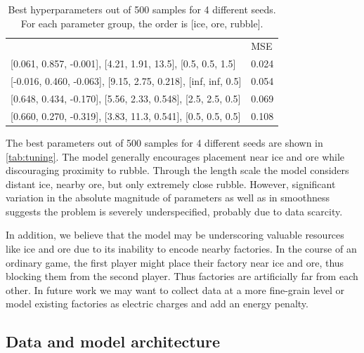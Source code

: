 \documentclass[10pt,twocolumn,letterpaper]{article}
\begin{document}
\begin{table}[h!]
  \begin{center}
  \begin{tabular}{|l|l|}
    \hline
    [coefficients, length scales, smoothness] & MSE \\
    {
      \footnotesize
      [0.061, 0.857, -0.001], [4.21, 1.91, 13.5], [0.5, 0.5, 1.5]
    } & 0.024  \\
    {
      \footnotesize
      [-0.016, 0.460, -0.063], [9.15, 2.75, 0.218], [inf, inf, 0.5]
    } & 0.054 \\
    {
      \footnotesize
      [0.648, 0.434, -0.170], [5.56, 2.33, 0.548], [2.5, 2.5, 0.5]
    } & 0.069 \\
    {
      \footnotesize
      [0.660, 0.270, -0.319], [3.83, 11.3, 0.541], [0.5, 0.5, 0.5]
    } & 0.108 \\
    \hline
  \end{tabular}
  \end{center}
  \caption{%
      Best hyperparameters out of 500 samples for 4 different seeds.
      For each parameter group, the order is [ice, ore, rubble].
  }
  \label{tab:tuning}
\end{table}

The best parameters out of 500 samples for 4
different seeds are shown in \autoref{tab:tuning}.
The model generally encourages placement near ice
and ore while discouraging proximity to rubble.
Through the length scale the model considers distant
ice, nearby ore, but only extremely close rubble.
However, significant variation in the absolute magnitude of
parameters as well as in smoothness suggests the problem
is severely underspecified, probably due to data scarcity.

In addition, we believe that the model may be underscoring valuable
resources like ice and ore due to its inability to encode nearby factories.
In the course of an ordinary game, the first player might place their
factory near ice and ore, thus blocking them from the second player.
Thus factories are artificially far from each other.
In future work we may want to collect data at a more fine-grain level or
model existing factories as electric charges and add an energy penalty.

\subsection{Data and model architecture}
\label{subsec:approach_main}
\end{document}
